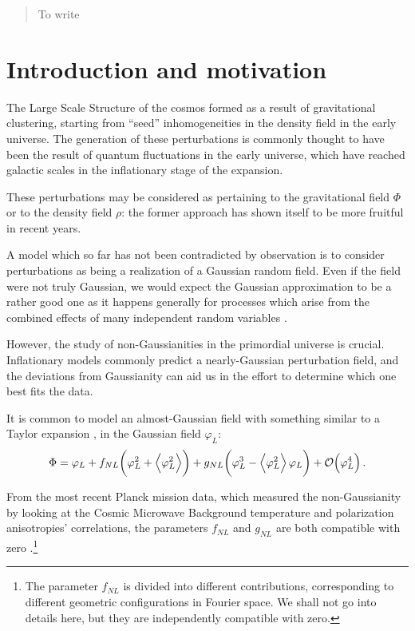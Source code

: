 \documentclass[main.tex]{subfiles}
\begin{document}
\begin{abstract}
    To write
\end{abstract}

\section{Introduction and motivation}

The Large Scale Structure of the cosmos formed as a result of gravitational clustering, starting from ``seed'' inhomogeneities in the density field in the early universe. 
The generation of these perturbations is commonly thought to have been the result of quantum fluctuations in the early universe, which have reached galactic scales in the inflationary stage of the expansion. 

These perturbations may be considered as pertaining to the gravitational field \(\Phi \) or to the density field \(\rho \): the former approach has shown itself to be more fruitful in recent years.

A model which so far has not been contradicted by observation is to consider perturbations as being a realization of a Gaussian random field. 
Even if the field were not truly Gaussian, we would expect the Gaussian approximation to be a rather good one as it happens generally for processes which arise from the combined effects of many independent random variables \cite[pag.\ 2]{celoriaPrimordialNonGaussianity2018}. 

However, the study of non-Gaussianities in the primordial universe is crucial. Inflationary models commonly predict a nearly-Gaussian perturbation field, and the deviations from Gaussianity can aid us in the effort to determine which one best fits the data. 

It is common to model an almost-Gaussian field with something similar to a Taylor expansion \cite[eq.\ 1]{matarreseAbundanceHighRedshift2000}, \cite[eq.\ 1]{celoriaPrimordialNonGaussianity2018} in the Gaussian field \(\varphi _L\): 
%
\begin{align} \label{eq:perturbed-gaussian-field}
\Phi = \varphi _L + f_{NL} \qty(\varphi _L^2 + \expval{\varphi _L^2}) + g_{NL} \qty(\varphi _L^3 - \expval{\varphi _L^2} \varphi _L) + \order{\varphi _L^{4}} 
\,.
\end{align}

From the most recent Planck mission data, which measured the non-Gaussianity by looking at the Cosmic Microwave Background temperature and polarization anisotropies' correlations, the parameters \(f_{NL}\) and \(g_{NL}\) are both compatible with zero \cite[]{planckcollaborationPlanck2018Results2019}.\footnote{The parameter \(f_{{NL}}\) is divided into different contributions, corresponding to different geometric configurations in Fourier space. We shall not go into details here, but they are independently compatible with zero.}
\end{document}
